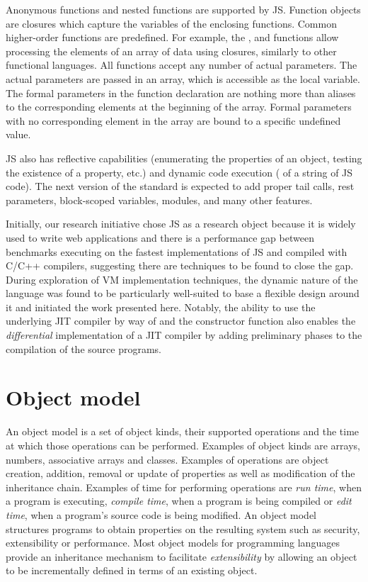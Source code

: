 Anonymous functions and nested functions are supported by JS. Function objects
are closures which capture the variables of the enclosing functions. Common
higher-order functions are predefined. For example, the , 
and  functions allow processing the elements of an array of data
using closures, similarly to other functional languages. All functions accept
any number of actual parameters. The actual parameters are passed in an array,
which is accessible as the  local variable. The formal parameters
in the function declaration are nothing more than aliases to the corresponding
elements at the beginning of the array. Formal parameters with no corresponding
element in the array are bound to a specific undefined value.

JS also has reflective capabilities (enumerating the properties of an object,
testing the existence of a property, etc.) and dynamic code execution
( of a string of JS code).  The next version of the standard is
expected to add proper tail calls, rest parameters, block-scoped variables,
modules, and many other features.

Initially, our research initiative chose JS as a research object because it is
widely used to write web applications and there is a performance gap between
benchmarks executing on the fastest implementations of JS and compiled with
C/C++ compilers, suggesting there are techniques to be found to close the gap.
During exploration of VM implementation techniques, the dynamic nature of the
language was found to be particularly well-suited to base a flexible design
around it and initiated the work presented here. Notably, the ability to use
the underlying JIT compiler by way of  and the 
constructor function also enables the \textit{differential} implementation of a
JIT compiler by adding preliminary phases to the compilation of the source
programs.

\section{Object model}

An object model is a set of object kinds, their supported operations and the
time at which those operations can be performed.  Examples of object kinds are
arrays, numbers, associative arrays and classes.  Examples of operations are
object creation, addition, removal or update of properties as well as
modification of the inheritance chain. Examples of time for performing
operations are \textit{run time}, when a program is executing, \textit{compile
time}, when a program is being compiled or \textit{edit time}, when a program's
source code is being modified. An object model structures programs to obtain
properties on the resulting system such as security, extensibility or
performance. Most object models for programming languages provide an
inheritance mechanism to facilitate \textit{extensibility} by allowing an object
to be incrementally defined in terms of an existing object.

